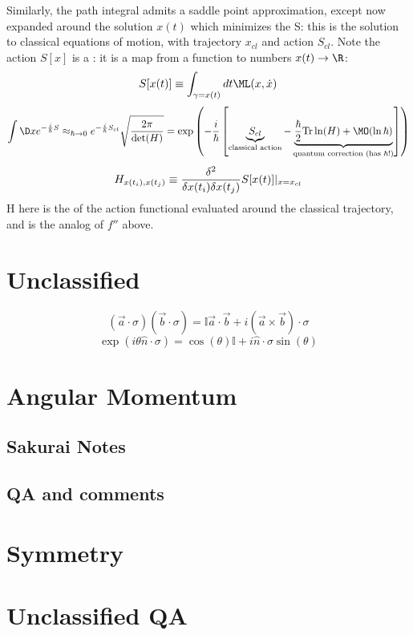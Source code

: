 \documentclass[10pt]{scrartcl}
\begin{document}
Similarly, the path integral admits a saddle point approximation, except now expanded around the solution $x(t)$ which minimizes the  S: this is the solution to classical equations of motion, with trajectory $x_{cl}$  and action $S_{cl}$.  Note the action  $S[x]$ is a : it is a map from a function to numbers $x(t) \rightarrow \R$:
\[S[x(t)] \equiv \int_{\gamma = x(t)} dt \ML(x, \dot{x}) \]
\[\int \D x e^{-{i \over \hbar} S} \approx_{\hbar \rightarrow 0} e^{-{i \over \hbar} S_{cl}} \sqrt{ 2 \pi \over \text{det}(H)} = \exp \left( -{i \over \hbar} \left[ \underbrace{S_{cl}}_{\text{classical action}} - \underbrace{{\hbar \over 2} \text{Tr} \ln(H)  + \MO(\ln \hbar)}_{\text{quantum correction (has $\hbar$!)}} \right]  \right) \] 
\[H_{x(t_i), x(t_j)} \equiv {\delta^2 \over \delta x(t_i) \delta x(t_j)} S[x(t)] |_{x = x_{cl}} \]
H here is the  of the action functional evaluated around the classical trajectory, and is the analog of $f''$ above.

\section{Unclassified}
\[ (\vec{a} \cdot \sigma) (\vec{b} \cdot \sigma) = \mathbb{I} \vec{a} \cdot \vec{b} + i (\vec{a} \times \vec{b}) \cdot \sigma  \]
\[ \exp \left( i \theta \hat{n} \cdot \sigma \right) = \cos(\theta) \mathbb{I} + i \hat{n} \cdot \sigma \sin(\theta) \]

\section{Angular Momentum}

\subsection{Sakurai Notes}

\subsection{QA and comments}


\section{Symmetry}

\section{Unclassified QA}
\end{document}
